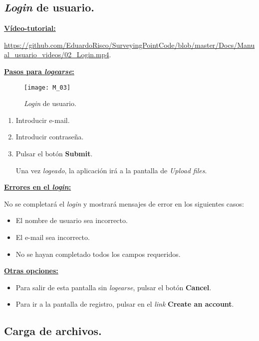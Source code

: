\subsection{\emph{Login} de usuario.}

\textbf{\underline{Vídeo-tutorial:}}

\url{https://github.com/EduardoRisco/SurveyingPointCode/blob/master/Docs/Manual_usuario_videos/02_Login.mp4}.


\textbf{\underline{Pasos para \emph{logearse}:} }


\begin{figure}[H]
	\centering
	\texttt{[image: M\_03]}
	\caption{\emph{Login} de usuario.}
	\label{fig:M_03}
\end{figure}


\begin{enumerate}

\item Introducir e-mail.
\item Introducir contraseña.
\item Pulsar el botón \textbf{Submit}.

Una vez \emph{logeado}, la aplicación irá a la pantalla de \emph{Upload files}.

\end{enumerate}

\textbf{\underline{Errores en el \emph{login}:} }

No se completará el \emph{login} y mostrará mensajes de error en los siguientes casos:

\begin{itemize}
\item El nombre de usuario sea incorrecto.
\item El e-mail sea incorrecto.
\item No se hayan completado todos los campos requeridos.
\end{itemize}

\textbf{\underline{Otras opciones:} }

\begin{itemize}

\item Para salir de esta pantalla sin \emph{logearse}, pulsar el botón \textbf{Cancel}.
\item Para ir a la pantalla de registro, pulsar en el \emph{link} \textbf{Create an account}.

\end{itemize}


\subsection{Carga de archivos.}

